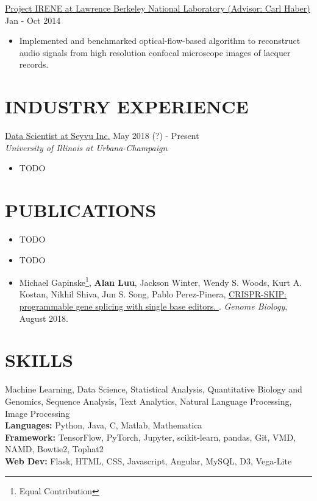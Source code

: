 \documentclass{res}
\begin{document}
\begin{resume}
\begin{itemize}
\end{itemize}
\href{https://irene.lbl.gov/}{Project IRENE at Lawrence Berkeley National Laboratory (Advisor: Carl Haber)}  \hfill Jan - Oct 2014\\
\begin{itemize}
\item {\normalfont Implemented and benchmarked optical-flow-based algorithm to reconstruct audio signals from high resolution confocal microscope images of lacquer records.}
\end{itemize}
\section{INDUSTRY EXPERIENCE}
\href{https://seyvu.ai/}{Data Scientist at Seyvu Inc.}  \hfill May 2018 (?) - Present \\ {\sl University of Illinois at Urbana-Champaign}\\
\begin{itemize}
\item TODO
\end{itemize}
\section{PUBLICATIONS}
\begin{itemize}[leftmargin=0in,label={}]
\item TODO
\item TODO
\item Michael Gapinske\footnote{Equal Contribution}, \textbf{Alan Luu}\footnotemark[1], Jackson Winter, Wendy S. Woods, Kurt A. Kostan, Nikhil Shiva, Jun S. Song, Pablo Perez-Pinera, \href{https://www.ncbi.nlm.nih.gov/pmc/articles/PMC6092781/}{CRISPR-SKIP: programmable gene splicing with single base editors.
}. \textit{Genome Biology}, August 2018.

\end{itemize}
\vspace{-10pt}

\section{SKILLS}
Machine Learning, Data Science, Statistical Analysis, Quantitative Biology and Genomics, Sequence Analysis, Text Analytics, Natural Language Processing, Image Processing %
\\ \textbf{Languages:} Python, Java, C, Matlab, Mathematica
\\ \textbf{Framework:} TensorFlow, PyTorch, Jupyter, scikit-learn, pandas, Git, VMD, NAMD, Bowtie2, Tophat2
\\ \textbf{Web Dev:} Flask, HTML, CSS, Javascript, Angular, MySQL, D3, Vega-Lite


\end{resume}
\end{document}
